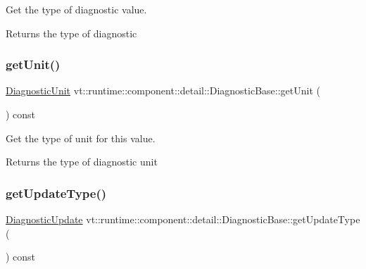 Get the type of diagnostic value. 

\begin{DoxyReturn}{Returns}
the type of diagnostic 
\end{DoxyReturn}
\mbox{\label{structvt_1_1runtime_1_1component_1_1detail_1_1_diagnostic_base_aae529e6a682145fa59f90bcea0d5e6d8}} 
\subsubsection{\texorpdfstring{get\+Unit()}{getUnit()}}
{\footnotesize\ttfamily \hyperlink{namespacevt_1_1runtime_1_1component_a99ec18b08862c712176126bb7d0e307a}{Diagnostic\+Unit} vt\+::runtime\+::component\+::detail\+::\+Diagnostic\+Base\+::get\+Unit (\begin{DoxyParamCaption}{ }\end{DoxyParamCaption}) const\hspace{0.3cm}{\ttfamily [inline]}}



Get the type of unit for this value. 

\begin{DoxyReturn}{Returns}
the type of diagnostic unit 
\end{DoxyReturn}
\mbox{\label{structvt_1_1runtime_1_1component_1_1detail_1_1_diagnostic_base_a8e43c10002b63cd3d3192103dcf44727}} 
\subsubsection{\texorpdfstring{get\+Update\+Type()}{getUpdateType()}}
{\footnotesize\ttfamily \hyperlink{namespacevt_1_1runtime_1_1component_a896637e6e183a909a17bfd8d3943c206}{Diagnostic\+Update} vt\+::runtime\+::component\+::detail\+::\+Diagnostic\+Base\+::get\+Update\+Type (\begin{DoxyParamCaption}{ }\end{DoxyParamCaption}) const\hspace{0.3cm}{\ttfamily [inline]}}



